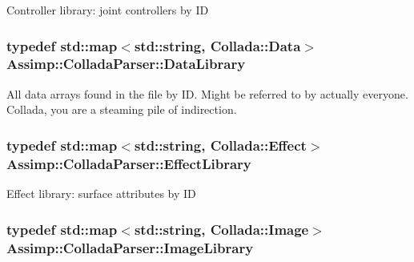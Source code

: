 Controller library\+: joint controllers by I\+D \hypertarget{class_assimp_1_1_collada_parser_a79a6311963fa5259e14edf7271063f03}{
\subsubsection[{Data\+Library}]{\setlength{\rightskip}{0pt plus 5cm}typedef std\+::map$<$std\+::string, {\bf Collada\+::\+Data}$>$ {\bf Assimp\+::\+Collada\+Parser\+::\+Data\+Library}\hspace{0.3cm}{\ttfamily [protected]}}}\label{class_assimp_1_1_collada_parser_a79a6311963fa5259e14edf7271063f03}
All data arrays found in the file by I\+D. Might be referred to by actually everyone. Collada, you are a steaming pile of indirection. \hypertarget{class_assimp_1_1_collada_parser_a22fbbae8a9f57784034d89f1c8569515}{
\subsubsection[{Effect\+Library}]{\setlength{\rightskip}{0pt plus 5cm}typedef std\+::map$<$std\+::string, {\bf Collada\+::\+Effect}$>$ {\bf Assimp\+::\+Collada\+Parser\+::\+Effect\+Library}\hspace{0.3cm}{\ttfamily [protected]}}}\label{class_assimp_1_1_collada_parser_a22fbbae8a9f57784034d89f1c8569515}
Effect library\+: surface attributes by I\+D \hypertarget{class_assimp_1_1_collada_parser_ace5e0dc4f9f8eaa8a1d9e3195b432cac}{
\subsubsection[{Image\+Library}]{\setlength{\rightskip}{0pt plus 5cm}typedef std\+::map$<$std\+::string, {\bf Collada\+::\+Image}$>$ {\bf Assimp\+::\+Collada\+Parser\+::\+Image\+Library}\hspace{0.3cm}{\ttfamily [protected]}}}\label{class_assimp_1_1_collada_parser_ace5e0dc4f9f8eaa8a1d9e3195b432cac}
